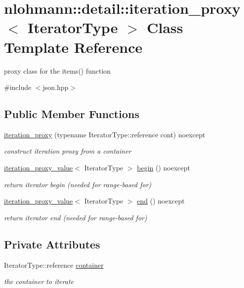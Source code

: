 \hypertarget{classnlohmann_1_1detail_1_1iteration__proxy}{}\section{nlohmann\+::detail\+::iteration\+\_\+proxy$<$ Iterator\+Type $>$ Class Template Reference}
\label{classnlohmann_1_1detail_1_1iteration__proxy}


proxy class for the items() function  




{\ttfamily \#include $<$json.\+hpp$>$}

\subsection*{Public Member Functions}
\begin{DoxyCompactItemize}
\item 
\mbox{\hyperlink{classnlohmann_1_1detail_1_1iteration__proxy_afe257e972e3b4658ef2e355f7389d4a5}{iteration\+\_\+proxy}} (typename Iterator\+Type\+::reference cont) noexcept
\begin{DoxyCompactList}\small\item\em construct iteration proxy from a container \end{DoxyCompactList}\item 
\mbox{\hyperlink{classnlohmann_1_1detail_1_1iteration__proxy__value}{iteration\+\_\+proxy\+\_\+value}}$<$ Iterator\+Type $>$ \mbox{\hyperlink{classnlohmann_1_1detail_1_1iteration__proxy_a379f86709d340c4ab1995539b8af623d}{begin}} () noexcept
\begin{DoxyCompactList}\small\item\em return iterator begin (needed for range-\/based for) \end{DoxyCompactList}\item 
\mbox{\hyperlink{classnlohmann_1_1detail_1_1iteration__proxy__value}{iteration\+\_\+proxy\+\_\+value}}$<$ Iterator\+Type $>$ \mbox{\hyperlink{classnlohmann_1_1detail_1_1iteration__proxy_a90091f8492d23576edef72c5e8b9d4cf}{end}} () noexcept
\begin{DoxyCompactList}\small\item\em return iterator end (needed for range-\/based for) \end{DoxyCompactList}\end{DoxyCompactItemize}
\subsection*{Private Attributes}
\begin{DoxyCompactItemize}
\item 
Iterator\+Type\+::reference \mbox{\hyperlink{classnlohmann_1_1detail_1_1iteration__proxy_a88c0532ba4a5de1d527b18053b24fd19}{container}}
\begin{DoxyCompactList}\small\item\em the container to iterate \end{DoxyCompactList}\end{DoxyCompactItemize}


